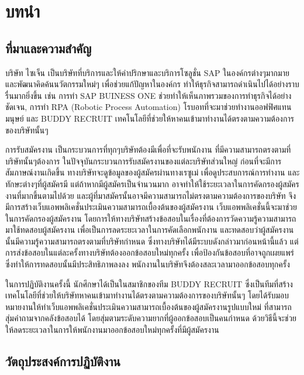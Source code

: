 \chapter{บทนำ}
\label{chapter:introduction}

\section{ที่มาและความสำคัญ}

บริษัท ไซเจ็น เป็นบริษัทที่บริการและให้คำปริกษาและบริการโซลูชั่น SAP ในองค์กรต่างๆมากมาย และพัฒนาคิดค้นนวัตกรรมใหม่ๆ เพื่อช่วยแก้ปัญหาในองค์กร ทำให้ธุรกิจสามารถดำเนินไปได้อย่างราบรื่นมากยิ่งขึ้น เช่น การทำ SAP BUINESS ONE ช่วยทำให้เห็นภาพรวมของการทำธุรกิจได้อย่างชัดเจน,  การทำ RPA (Robotic Process Automation) โรบอทที่จะมาช่วยทำงานออฟฟิศแทนมนุษย์ และ BUDDY RECRUIT เทคโนโลยีที่ช่วยให้หาคนเข้ามาทำงานได้ตรงตามความต้องการของบริษัทนั้นๆ

การรับสมัครงาน เป็นกระบวนการที่ทุกๆบริษัทต้องมีเพื่อที่จะรับพนักงาน ที่มีความสามารถตรงตามที่บริษัทนั้นๆต้องการ ในปัจจุบันกระบวนการรับสมัครงานของแต่ละบริษัทส่วนใหญ่ ก่อนที่จะมีการสัมภาษณ์งานเกิดขึ้น ทางบริษัทจะดูข้อมูลของผู้สมัครผ่านทางเรซูเม่ เพื่อดูประสบการณ์การทำงาน และทักษะต่างๆที่ผู้สมัครมี แต่ถ้าหากมีผู้สมัครเป็นจำนวนมาก อาจทำให้ใช้ระยะเวลาในการคัดกรองผู้สมัครงานที่มากขึ้นตามไปด้วย และผู้ที่มาสมัครนั้นอาจมีความสามารถไม่ตรงตามความต้องการของบริษัท จึงมีการสร้างเว็บแอพพลิเคชั่นประเมินความสามารถเบื้องต้นของผู้สมัครงาน เว็บแอพพลิเคชั่นนี้จะมาช่วยในการคัดกรองผู้สมัครงาน โดยการให้ทางบริษัทสร้างข้อสอบในเรื่องที่ต้องการวัดความรู้ความสามารถ มาใช้ทดสอบผู้สมัครงาน เพื่อเป็นการลดระยะเวลาในการคัดเลือกพนักงาน และทดสอบว่าผู้สมัครงานนั้นมีความรู้ความสามารถตรงตามที่บริษัทกำหนด ซึ่งทางบริษัทได้มีระบบดังกล่าวมาก่อนหน้านี้แล้ว แต่การส่งข้อสอบในแต่ละครั้งทางบริษัทต้องออกข้อสอบใหม่ทุกครั้ง เพื่อป้องกันข้อสอบที่อาจถูกเผยแพร่ซึ่งทําให้การทดสอบนั้นมีประสิทธิภาพลงลง  พนักงานในบริษัทจึงต้องสละเวลามาออกข้อสอบทุกครั้ง

ในการปฏิบัติงานครั้งนี้ นักศึกษาได้เป็นในสมาชิกของทีม BUDDY RECRUIT ซึ่งเป็นทีมที่สร้างเทคโนโลยีที่ช่วยให้บริษัทหาคนเข้ามาทำงานได้ตรงตามความต้องการของบริษัทนั้นๆ  โดยได้รับมอบหมายงานให้ทำเว็บแอพพลิเคชั่นประเมินความสามารถเบื้องต้นของผู้สมัครงานรูปแบบใหม่ ที่สามารถสุ่มคำถามจากคลังข้อสอบได้ โดยสุ่มตามระดับความยากที่ผู้ออกข้อสอบเป็นคนกำหนด ด้วยวิธีนี้จะช่วยให้ลดระยะเวลาในการให้พนักงานมาออกข้อสอบใหม่ทุกครั้งที่มีผู้สมัครงาน

\section{วัตถุประสงค์การปฏิบัติงาน}


